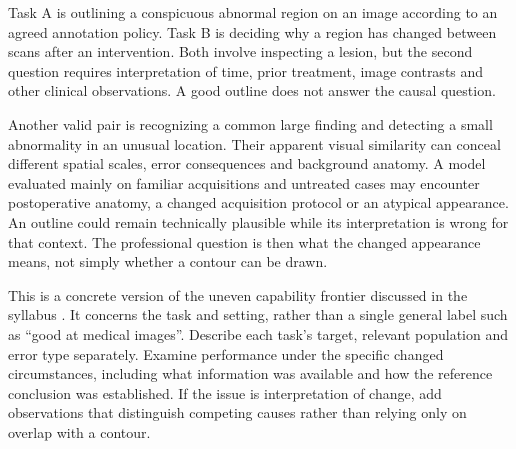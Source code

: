 \biomedicalanswer
{}
Task A is outlining a conspicuous abnormal region on an image according to an agreed annotation policy. Task B is deciding why a region has changed between scans after an intervention. Both involve inspecting a lesion, but the second question requires interpretation of time, prior treatment, image contrasts and other clinical observations. A good outline does not answer the causal question.

Another valid pair is recognizing a common large finding and detecting a small abnormality in an unusual location. Their apparent visual similarity can conceal different spatial scales, error consequences and background anatomy.
A model evaluated mainly on familiar acquisitions and untreated cases may encounter postoperative anatomy, a changed acquisition protocol or an atypical appearance. An outline could remain technically plausible while its interpretation is wrong for that context. The professional question is then what the changed appearance means, not simply whether a contour can be drawn.

This is a concrete version of the uneven capability frontier discussed in the syllabus \citep{mollick2026coexistence}. It concerns the task and setting, rather than a single general label such as ``good at medical images''.
Describe each task's target, relevant population and error type separately. Examine performance under the specific changed circumstances, including what information was available and how the reference conclusion was established. If the issue is interpretation of change, add observations that distinguish competing causes rather than relying only on overlap with a contour.

